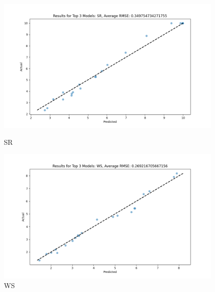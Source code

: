 \begin{figure}[H]
    \centering
    \begin{minipage}{0.495\textwidth}
        \centering
        \includegraphics[width=\linewidth]{reg_section_specxtra/images_reg_ensemble/ensemble_learning_rmse_plot_top_3_Models_SR.png}
        \caption{SR}
        \label{fig:sr_ensemble}
    \end{minipage}\hfill
    \begin{minipage}{0.495\textwidth}
        \centering
        \includegraphics[width=\linewidth]{reg_section_specxtra/images_reg_ensemble/ensemble_learning_rmse_plot_top_3_Models_WS.png}
        \caption{WS}
        \label{fig:ws_ensemble}
    \end{minipage}
\end{figure}

